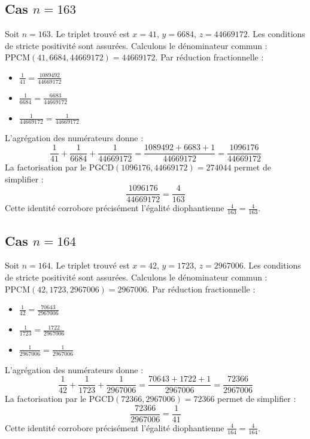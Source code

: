 \documentclass[11pt,a4paper]{article}
\begin{document}
\subsection{Cas $n = 163$}
Soit $n = 163$. Le triplet trouvé est $x = 41$, $y = 6684$, $z = 44669172$.
Les conditions de stricte positivité sont assurées.
Calculons le dénominateur commun : $\text{PPCM}(41, 6684, 44669172) = 44669172$.
Par réduction fractionnelle :
\begin{itemize}
    \item $\frac{1}{41} = \frac{1089492}{44669172}$
    \item $\frac{1}{6684} = \frac{6683}{44669172}$
    \item $\frac{1}{44669172} = \frac{1}{44669172}$
\end{itemize}
L'agrégation des numérateurs donne :
$$ \frac{1}{41} + \frac{1}{6684} + \frac{1}{44669172} = \frac{1089492 + 6683 + 1}{44669172} = \frac{1096176}{44669172} $$
La factorisation par le $\text{PGCD}(1096176, 44669172) = 274044$ permet de simplifier :
$$ \frac{1096176}{44669172} = \frac{4}{163} $$
Cette identité corrobore précisément l'égalité diophantienne $\frac{4}{163} = \frac{4}{163}$.

\subsection{Cas $n = 164$}
Soit $n = 164$. Le triplet trouvé est $x = 42$, $y = 1723$, $z = 2967006$.
Les conditions de stricte positivité sont assurées.
Calculons le dénominateur commun : $\text{PPCM}(42, 1723, 2967006) = 2967006$.
Par réduction fractionnelle :
\begin{itemize}
    \item $\frac{1}{42} = \frac{70643}{2967006}$
    \item $\frac{1}{1723} = \frac{1722}{2967006}$
    \item $\frac{1}{2967006} = \frac{1}{2967006}$
\end{itemize}
L'agrégation des numérateurs donne :
$$ \frac{1}{42} + \frac{1}{1723} + \frac{1}{2967006} = \frac{70643 + 1722 + 1}{2967006} = \frac{72366}{2967006} $$
La factorisation par le $\text{PGCD}(72366, 2967006) = 72366$ permet de simplifier :
$$ \frac{72366}{2967006} = \frac{1}{41} $$
Cette identité corrobore précisément l'égalité diophantienne $\frac{4}{164} = \frac{4}{164}$.
\end{document}
